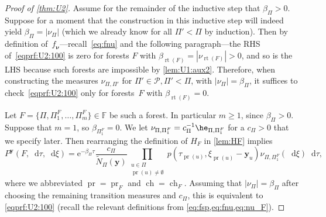 \documentclass[reqno,draft]{amsart}
\numberwithin{equation}{section}
\theoremstyle{plain}
\theoremstyle{remark}
\newcommand*\diff{\mathop{}\!\mathrm{d}}
\newcommand{\e}{\mathrm{e}}
\DeclareMathOperator{\ch}{ch}
\DeclareMathOperator{\pr}{pr}
\newcommand{\fpart}{\Pi} %
\DeclareMathOperator{\rt}{rt}
\newcommand{\nn}{\widetilde{N}} %
\newcommand{\la}{\beta} %
\newcommand{\nut}[1]{|\nu_{#1}|}
\begin{document}
\begin{proof}[Proof of \cref{thm:U2}]
    Assume for the remainder of the inductive step that $\la_\fpart > 0$. Suppose for a moment that the construction in this inductive step will indeed yield $\la_\fpart = \nut{\fpart}$ (which we already know for all $\fpart' < \fpart$ by induction).
    Then by definition of~$f_{\boldsymbol \nu}$---recall~\eqref{eq:fnu} and the following paragraph---the RHS of~\eqref{eqprf:U2:100} is zero for forests $F$ with $\la_{\rt(F)} = \nut{\rt(F)} > 0$, and so is the LHS because such forests are impossible by \cref{lem:U1:aux2}.
    Therefore, when constructing the measures $\nu_{\fpart,\fpart'}$ for $\fpart'\in \mathcal{P}, \fpart' < \fpart$, with $\nut{\fpart} = \la_\fpart$, it suffices to check~\eqref{eqprf:U2:100} only for forests~$F$ with $\la_{\rt(F)}=0$.

    Let $F= \{\fpart,\fpart_1^F, \ldots ,\fpart_m^F\} \in \mathbb{F}$ be such a forest. In particular $ m \ge 1$, since $\la_\fpart > 0$.
    Suppose that $m=1$, so $\la_{\fpart^F_1} = 0$. We let $\nu_{\fpart,\fpart_1^F} = c_\fpart^{-1} \he_{\fpart,\fpart_1^F}$ for a $c_\fpart>0$ that we specify later. Then rearranging the definition of $H_F$ in \cref{lem:HF} implies
    \[
        P^{\boldsymbol y}(F,\diff \tau,\diff \xi) = \e^{-\la_\fpart \tau} \frac{c_\fpart}{\nn_\fpart(\boldsymbol y)} \prod_{\substack{u\in \fpart \\ \pr(u) \neq \emptyset } } p(\tau_{\pr(u)},\xi_{\pr(u)}-\boldsymbol y_u) \nu_{\fpart,\fpart_1^F}(\diff \xi) \diff \tau,
        \] where we abbreviated $\pr = \pr_F$ and $\ch = \ch_F$. Assuming that $\nut{\fpart} = \la_\fpart$ after choosing the remaining transition measures and $c_\fpart$, this is equivalent to \cref{eqprf:U2:100} (recall the relevant definitions from \cref{eq:fsp,eq:fnu,eq:nu_F}).


\end{proof}
\end{document}
